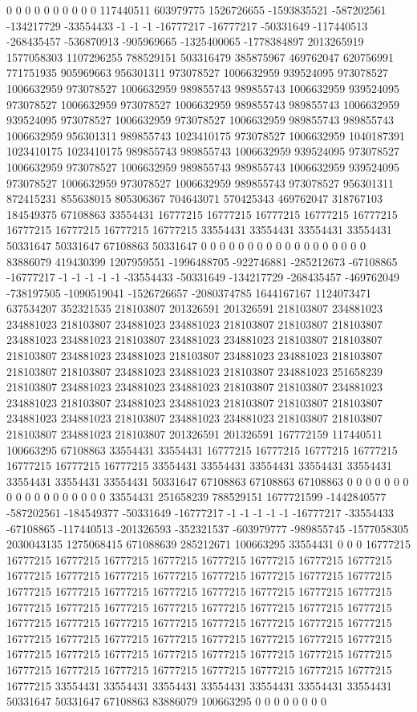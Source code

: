 0 0 0 0 0 0 0 0 0 0 117440511 603979775 1526726655 -1593835521 -587202561 -134217729 -33554433 -1 -1 -1 -16777217 -16777217 -50331649 -117440513 -268435457 -536870913 -905969665 -1325400065 -1778384897 2013265919 1577058303 1107296255 788529151 503316479 385875967 469762047 620756991 771751935 905969663 956301311 973078527 1006632959 939524095 973078527 1006632959 973078527 1006632959 989855743 989855743 1006632959 939524095 973078527 1006632959 973078527 1006632959 989855743 989855743 1006632959 939524095 973078527 1006632959 973078527 1006632959 989855743 989855743 1006632959 956301311 989855743 1023410175 973078527 1006632959 1040187391 1023410175 1023410175 989855743 989855743 1006632959 939524095 973078527 1006632959 973078527 1006632959 989855743 989855743 1006632959 939524095 973078527 1006632959 973078527 1006632959 989855743 973078527 956301311 872415231 855638015 805306367 704643071 570425343 469762047 318767103 184549375 67108863 33554431 16777215 16777215 16777215 16777215 16777215 16777215 16777215 16777215 16777215 33554431 33554431 33554431 33554431 50331647 50331647 67108863 50331647 0 0 0 0 0 0 0 0
0 0 0 0 0 0 0 0 0 0 83886079 419430399 1207959551 -1996488705 -922746881 -285212673 -67108865 -16777217 -1 -1 -1 -1 -1 -33554433 -50331649 -134217729 -268435457 -469762049 -738197505 -1090519041 -1526726657 -2080374785 1644167167 1124073471 637534207 352321535 218103807 201326591 201326591 218103807 234881023 234881023 218103807 234881023 234881023 218103807 218103807 218103807 234881023 234881023 218103807 234881023 234881023 218103807 218103807 218103807 234881023 234881023 218103807 234881023 234881023 218103807 218103807 218103807 234881023 234881023 218103807 234881023 251658239 218103807 234881023 234881023 234881023 218103807 218103807 234881023 234881023 218103807 234881023 234881023 218103807 218103807 218103807 234881023 234881023 218103807 234881023 234881023 218103807 218103807 218103807 234881023 218103807 201326591 201326591 167772159 117440511 100663295 67108863 33554431 33554431 16777215 16777215 16777215 16777215 16777215 16777215 16777215 33554431 33554431 33554431 33554431 33554431 33554431 33554431 33554431 50331647 67108863 67108863 67108863 0 0 0 0 0 0 0 0
0 0 0 0 0 0 0 0 0 0 33554431 251658239 788529151 1677721599 -1442840577 -587202561 -184549377 -50331649 -16777217 -1 -1 -1 -1 -1 -16777217 -33554433 -67108865 -117440513 -201326593 -352321537 -603979777 -989855745 -1577058305 2030043135 1275068415 671088639 285212671 100663295 33554431 0 0 0 16777215 16777215 16777215 16777215 16777215 16777215 16777215 16777215 16777215 16777215 16777215 16777215 16777215 16777215 16777215 16777215 16777215 16777215 16777215 16777215 16777215 16777215 16777215 16777215 16777215 16777215 16777215 16777215 16777215 16777215 16777215 16777215 16777215 16777215 16777215 16777215 16777215 16777215 16777215 16777215 16777215 16777215 16777215 16777215 16777215 16777215 16777215 16777215 16777215 16777215 16777215 16777215 16777215 16777215 16777215 16777215 16777215 16777215 16777215 16777215 16777215 16777215 16777215 16777215 16777215 16777215 33554431 33554431 33554431 33554431 33554431 33554431 33554431 50331647 50331647 67108863 83886079 100663295 0 0 0 0 0 0 0 0
